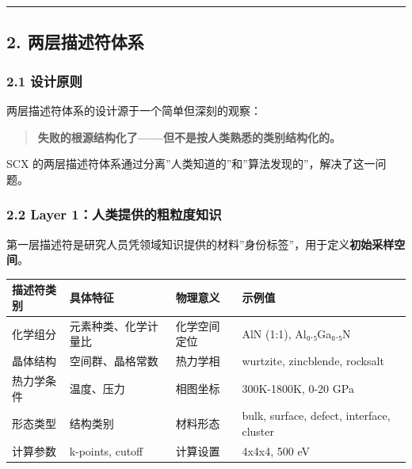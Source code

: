 \documentclass[
  12pt,
]{ctexart}
\begin{document}
\begin{center}\rule{0.5\linewidth}{0.5pt}\end{center}

\subsection{2.
两层描述符体系}\label{ux4e24ux5c42ux63cfux8ff0ux7b26ux4f53ux7cfb}

\subsubsection{2.1 设计原则}\label{ux8bbeux8ba1ux539fux5219}

两层描述符体系的设计源于一个简单但深刻的观察：

\begin{quote}
\textbf{失败的根源结构化了------但不是按人类熟悉的类别结构化的。}
\end{quote}

SCX
的两层描述符体系通过分离''人类知道的''和''算法发现的''，解决了这一问题。

\subsubsection{2.2 Layer
1：人类提供的粗粒度知识}\label{layer-1ux4ebaux7c7bux63d0ux4f9bux7684ux7c97ux7c92ux5ea6ux77e5ux8bc6}

第一层描述符是研究人员凭领域知识提供的材料''身份标签''，用于定义\textbf{初始采样空间}。

\begin{longtable}[]{@{}
  >{\raggedright\arraybackslash}p{}
  >{\raggedright\arraybackslash}p{}
  >{\raggedright\arraybackslash}p{}
  >{\raggedright\arraybackslash}p{}@{}}
\toprule\noalign{}
\begin{minipage}[b]{\linewidth}\raggedright
描述符类别
\end{minipage} & \begin{minipage}[b]{\linewidth}\raggedright
具体特征
\end{minipage} & \begin{minipage}[b]{\linewidth}\raggedright
物理意义
\end{minipage} & \begin{minipage}[b]{\linewidth}\raggedright
示例值
\end{minipage} \\
\midrule\noalign{}
\endhead
\bottomrule\noalign{}
\endlastfoot
化学组分 & 元素种类、化学计量比 & 化学空间定位 & AlN (1:1),
Al₀.₅Ga₀.₅N \\
晶体结构 & 空间群、晶格常数 & 热力学相 & wurtzite, zincblende,
rocksalt \\
热力学条件 & 温度、压力 & 相图坐标 & 300K-1800K, 0-20 GPa \\
形态类型 & 结构类别 & 材料形态 & bulk, surface, defect, interface,
cluster \\
计算参数 & k-points, cutoff & 计算设置 & 4x4x4, 500 eV \\
\end{longtable}
\end{document}
